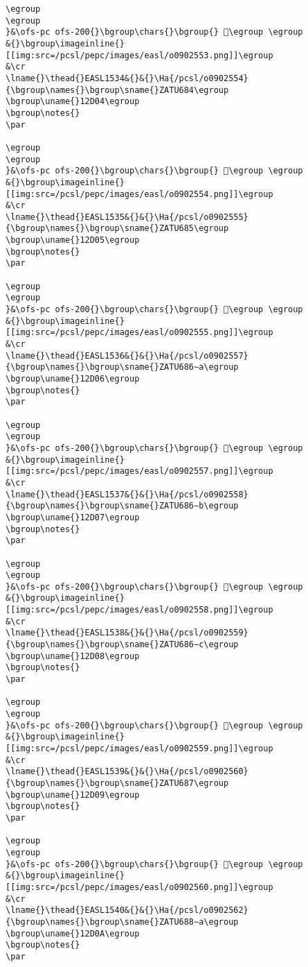\begin{verbatim}
\egroup
\egroup
}&\ofs-pc ofs-200{}\bgroup\chars{}\bgroup{} 𒴃\egroup \egroup
&{}\bgroup\imageinline{}[[img:src=/pcsl/pepc/images/easl/o0902553.png]]\egroup
&\cr
\lname{}\thead{}EASL1534&{}&{}\Ha{/pcsl/o0902554}{\bgroup\names{}\bgroup\sname{}ZATU684\egroup
\bgroup\uname{}12D04\egroup
\bgroup\notes{}
\par 

\egroup
\egroup
}&\ofs-pc ofs-200{}\bgroup\chars{}\bgroup{} 𒴄\egroup \egroup
&{}\bgroup\imageinline{}[[img:src=/pcsl/pepc/images/easl/o0902554.png]]\egroup
&\cr
\lname{}\thead{}EASL1535&{}&{}\Ha{/pcsl/o0902555}{\bgroup\names{}\bgroup\sname{}ZATU685\egroup
\bgroup\uname{}12D05\egroup
\bgroup\notes{}
\par 

\egroup
\egroup
}&\ofs-pc ofs-200{}\bgroup\chars{}\bgroup{} 𒴅\egroup \egroup
&{}\bgroup\imageinline{}[[img:src=/pcsl/pepc/images/easl/o0902555.png]]\egroup
&\cr
\lname{}\thead{}EASL1536&{}&{}\Ha{/pcsl/o0902557}{\bgroup\names{}\bgroup\sname{}ZATU686∼a\egroup
\bgroup\uname{}12D06\egroup
\bgroup\notes{}
\par 

\egroup
\egroup
}&\ofs-pc ofs-200{}\bgroup\chars{}\bgroup{} 𒴆\egroup \egroup
&{}\bgroup\imageinline{}[[img:src=/pcsl/pepc/images/easl/o0902557.png]]\egroup
&\cr
\lname{}\thead{}EASL1537&{}&{}\Ha{/pcsl/o0902558}{\bgroup\names{}\bgroup\sname{}ZATU686∼b\egroup
\bgroup\uname{}12D07\egroup
\bgroup\notes{}
\par 

\egroup
\egroup
}&\ofs-pc ofs-200{}\bgroup\chars{}\bgroup{} 𒴇\egroup \egroup
&{}\bgroup\imageinline{}[[img:src=/pcsl/pepc/images/easl/o0902558.png]]\egroup
&\cr
\lname{}\thead{}EASL1538&{}&{}\Ha{/pcsl/o0902559}{\bgroup\names{}\bgroup\sname{}ZATU686∼c\egroup
\bgroup\uname{}12D08\egroup
\bgroup\notes{}
\par 

\egroup
\egroup
}&\ofs-pc ofs-200{}\bgroup\chars{}\bgroup{} 𒴈\egroup \egroup
&{}\bgroup\imageinline{}[[img:src=/pcsl/pepc/images/easl/o0902559.png]]\egroup
&\cr
\lname{}\thead{}EASL1539&{}&{}\Ha{/pcsl/o0902560}{\bgroup\names{}\bgroup\sname{}ZATU687\egroup
\bgroup\uname{}12D09\egroup
\bgroup\notes{}
\par 

\egroup
\egroup
}&\ofs-pc ofs-200{}\bgroup\chars{}\bgroup{} 𒴉\egroup \egroup
&{}\bgroup\imageinline{}[[img:src=/pcsl/pepc/images/easl/o0902560.png]]\egroup
&\cr
\lname{}\thead{}EASL1540&{}&{}\Ha{/pcsl/o0902562}{\bgroup\names{}\bgroup\sname{}ZATU688∼a\egroup
\bgroup\uname{}12D0A\egroup
\bgroup\notes{}
\par 


\end{verbatim}

